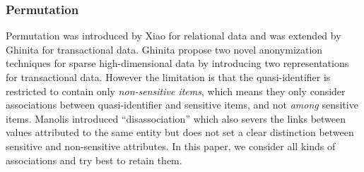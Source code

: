 \subsubsection{Permutation}

Permutation was introduced by Xiao \etal \cite{Xiao:2006:Anatomy} for
relational data and was extended by
Ghinita \etal \cite{2011:TKDE:Anonymous}
for transactional data.
Ghinita \etal propose two novel anonymization techniques for sparse
high-dimensional data by introducing two representations for transactional
data. However the limitation is that the quasi-identifier is restricted to
contain only {\em non-sensitive items}, which means they only
consider associations between quasi-identifier
and sensitive items, and not {\em among} sensitive items.
Manolis \etal \cite{terrovitis:privacy} introduced ``disassociation''
which also severs the links between values attributed to the 
same entity but does not
set a clear distinction between sensitive and non-sensitive attributes.
In this paper, we consider all kinds of associations and try best to
retain them.
%

